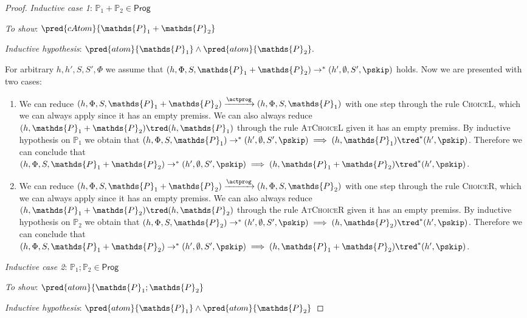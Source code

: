 {\begin{proof}
\textit{Inductive case 1}: $\mathds{P}_1 + \mathds{P}_2 \in \mathsf{Prog}$

\textit{To show}: $\pred{cAtom}{\mathds{P}_1 + \mathds{P}_2}$

\textit{Inductive hypothesis}: $\pred{atom}{\mathds{P}_1} \land \pred{atom}{\mathds{P}_2}.$

For arbitrary $h, h', S, S', \Phi$ we assume that $(h, \Phi, S, \mathds{P}_1 + \mathds{P}_2) \rightarrow^* (h', \emptyset, S', \pskip)$ holds. Now we are presented with two cases:
\begin{enumerate}
\item We can reduce $(h, \Phi, S, \mathds{P}_1 + \mathds{P}_2) \xrightarrow{\actprog} (h, \Phi, S, \mathds{P}_1)$ with one step through the rule \textsc{ChoiceL}, which we can always apply since it has an empty premiss. We can also always reduce $(h, \mathds{P}_1 + \mathds{P}_2) \tred (h, \mathds{P}_1)$ through the rule \textsc{AtChoiceL} given it has an empty premiss. By inductive hypothesis on $\mathds{P}_1$ we obtain that $(h, \Phi, S, \mathds{P}_1) \rightarrow^* (h', \emptyset, S', \pskip) \implies (h, \mathds{P}_1) \tred^* (h', \pskip)$. Therefore we can conclude that $(h, \Phi, S, \mathds{P}_1 + \mathds{P}_2) \rightarrow^* (h', \emptyset, S', \pskip) \implies  (h, \mathds{P}_1 + \mathds{P}_2) \tred^* (h', \pskip)$.
\item We can reduce $(h, \Phi, S, \mathds{P}_1 + \mathds{P}_2) \xrightarrow{\actprog} (h, \Phi, S, \mathds{P}_2)$ with one step through the rule \textsc{ChoiceR}, which we can always apply since it has an empty premiss. We can also always reduce $(h, \mathds{P}_1 + \mathds{P}_2) \tred (h, \mathds{P}_2)$ through the rule \textsc{AtChoiceR} given it has an empty premiss. By inductive hypothesis on $\mathds{P}_2$ we obtain that $(h, \Phi, S, \mathds{P}_2) \rightarrow^* (h', \emptyset, S', \pskip) \implies (h, \mathds{P}_2) \tred^* (h', \pskip)$. Therefore we can conclude that $(h, \Phi, S, \mathds{P}_1 + \mathds{P}_2) \rightarrow^* (h', \emptyset, S', \pskip) \implies  (h, \mathds{P}_1 + \mathds{P}_2) \tred^* (h', \pskip)$. \\
\end{enumerate}

\textit{Inductive case 2}: $\mathds{P}_1 ; \mathds{P}_2 \in \mathsf{Prog}$

\textit{To show}: $\pred{atom}{\mathds{P}_1 ; \mathds{P}_2}$

\textit{Inductive hypothesis}: $\pred{atom}{\mathds{P}_1} \land \pred{atom}{\mathds{P}_2}$


\end{proof}}

